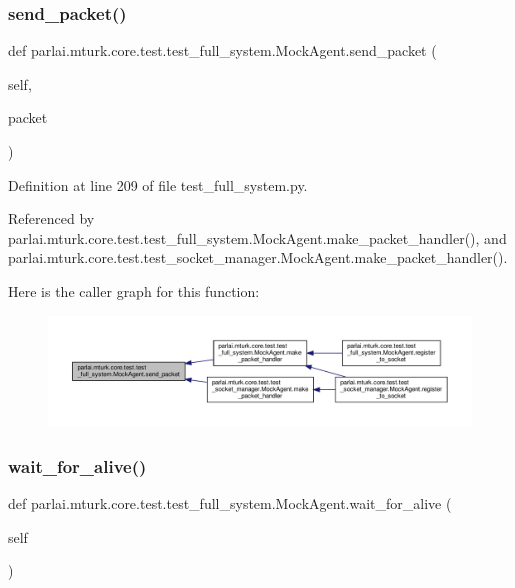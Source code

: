 \subsubsection{\texorpdfstring{send\+\_\+packet()}{send\_packet()}}
{\footnotesize\ttfamily def parlai.\+mturk.\+core.\+test.\+test\+\_\+full\+\_\+system.\+Mock\+Agent.\+send\+\_\+packet (\begin{DoxyParamCaption}\item[{}]{self,  }\item[{}]{packet }\end{DoxyParamCaption})}



Definition at line 209 of file test\+\_\+full\+\_\+system.\+py.



Referenced by parlai.\+mturk.\+core.\+test.\+test\+\_\+full\+\_\+system.\+Mock\+Agent.\+make\+\_\+packet\+\_\+handler(), and parlai.\+mturk.\+core.\+test.\+test\+\_\+socket\+\_\+manager.\+Mock\+Agent.\+make\+\_\+packet\+\_\+handler().

Here is the caller graph for this function\+:
\nopagebreak
\begin{figure}[H]
\begin{center}
\leavevmode
\includegraphics[width=350pt]{classparlai_1_1mturk_1_1core_1_1test_1_1test__full__system_1_1MockAgent_a0a286b82f9e0758cdfabf9b7fb51e6b6_icgraph}
\end{center}
\end{figure}
\mbox{\label{classparlai_1_1mturk_1_1core_1_1test_1_1test__full__system_1_1MockAgent_a92e5fffe32ac3011adeedbdc34b5506c}} 
\subsubsection{\texorpdfstring{wait\+\_\+for\+\_\+alive()}{wait\_for\_alive()}}
{\footnotesize\ttfamily def parlai.\+mturk.\+core.\+test.\+test\+\_\+full\+\_\+system.\+Mock\+Agent.\+wait\+\_\+for\+\_\+alive (\begin{DoxyParamCaption}\item[{}]{self }\end{DoxyParamCaption})}



